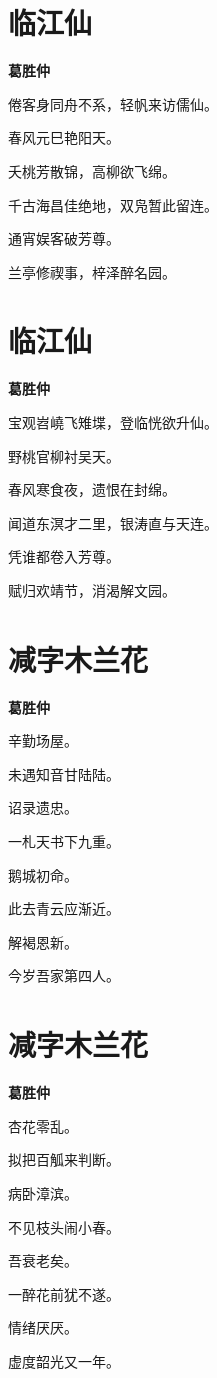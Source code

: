 \documentclass[12pt,a4paper]{ctexbook}
\begin{document}
\section{临江仙}
\textbf{葛胜仲}\par\vspace{0.5em}
倦客身同舟不系，轻帆来访儒仙。\par
春风元巳艳阳天。\par
夭桃芳散锦，高柳欲飞绵。\par
千古海昌佳绝地，双凫暂此留连。\par
通宵娱客破芳尊。\par
兰亭修禊事，梓泽醉名园。\par

\section{临江仙}
\textbf{葛胜仲}\par\vspace{0.5em}
宝观岧嶢飞雉堞，登临恍欲升仙。\par
野桃官柳衬吴天。\par
春风寒食夜，遗恨在封绵。\par
闻道东溟才二里，银涛直与天连。\par
凭谁都卷入芳尊。\par
赋归欢靖节，消渴解文园。\par

\section{减字木兰花}
\textbf{葛胜仲}\par\vspace{0.5em}
辛勤场屋。\par
未遇知音甘陆陆。\par
诏录遗忠。\par
一札天书下九重。\par
鹅城初命。\par
此去青云应渐近。\par
解褐恩新。\par
今岁吾家第四人。\par

\section{减字木兰花}
\textbf{葛胜仲}\par\vspace{0.5em}
杏花零乱。\par
拟把百觚来判断。\par
病卧漳滨。\par
不见枝头闹小春。\par
吾衰老矣。\par
一醉花前犹不遂。\par
情绪厌厌。\par
虚度韶光又一年。\par
\end{document}
